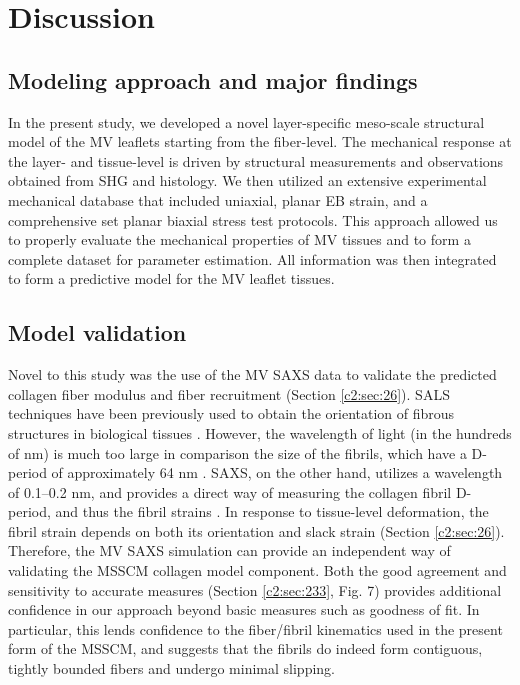 \section{Discussion}

\subsection{Modeling approach and major findings}

    In the present study, we developed a novel layer-specific meso-scale structural model of the MV leaflets starting from the fiber-level. The mechanical response at the layer- and tissue-level is driven by structural measurements and observations obtained from SHG and histology. We then utilized an extensive experimental mechanical database that included uniaxial, planar EB strain, and a comprehensive set planar biaxial stress test protocols. This approach allowed us to properly evaluate the mechanical properties of MV tissues and to form a complete dataset for parameter estimation. All information was then integrated to form a predictive model for the MV leaflet tissues.
    
    
\subsection{Model validation}

    Novel to this study was the use of the MV SAXS data \cite{liao_relation_2007} to validate the predicted collagen fiber modulus and fiber recruitment (Section \ref{c2:sec:26}). SALS techniques have been previously used to obtain the orientation of fibrous structures in biological tissues \cite{sacks_small_1997}. However, the wavelength of light (in the hundreds of nm) is much too large in comparison the size of the fibrils, which have a D-period of approximately 64 nm \cite{kastelic_structural_1980}\cite{hodge_recent_1963}\cite{chapman_electron_1984}. SAXS, on the other hand, utilizes a wavelength of 0.1–0.2 nm, and provides a direct way of measuring the collagen fibril D-period, and thus the fibril strains \cite{sasaki_elongation_1996}\cite{sasaki_stress_1996}\cite{liao_relation_2007}. In response to tissue-level deformation, the fibril strain depends on both its orientation and slack strain (Section \ref{c2:sec:26}). Therefore, the MV SAXS simulation can provide an independent way of validating the MSSCM collagen model component. Both the good agreement and sensitivity to accurate measures (Section \ref{c2:sec:233}, Fig. 7) provides additional confidence in our approach beyond basic measures such as goodness of fit. In particular, this lends confidence to the fiber/fibril kinematics used in the present form of the MSSCM, and suggests that the fibrils do indeed form contiguous, tightly bounded fibers and undergo minimal slipping.
    
